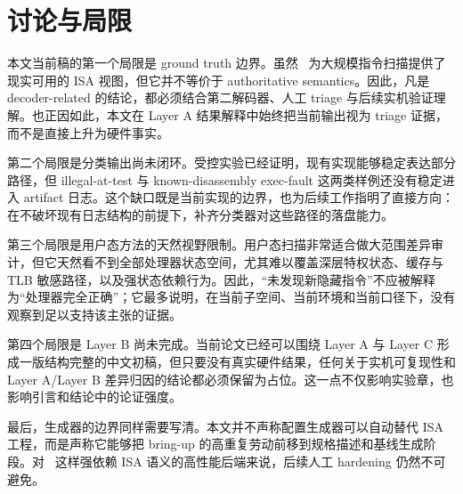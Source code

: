 \chapter{讨论与局限}

本文当前稿的第一个局限是 ground truth 边界。虽然 \capstone\ 为大规模指令扫描提供了现实可用的 ISA 视图，但它并不等价于 authoritative semantics。因此，凡是 decoder-related 的结论，都必须结合第二解码器、人工 triage 与后续实机验证理解。也正因如此，本文在 Layer A 结果解释中始终把当前输出视为 triage 证据，而不是直接上升为硬件事实。

第二个局限是分类输出尚未闭环。受控实验已经证明，现有实现能够稳定表达部分路径，但 illegal-at-test 与 known-disassembly exec-fault 这两类样例还没有稳定进入 artifact 日志。这个缺口既是当前实现的边界，也为后续工作指明了直接方向：在不破坏现有日志结构的前提下，补齐分类器对这些路径的落盘能力。

第三个局限是用户态方法的天然视野限制。用户态扫描非常适合做大范围差异审计，但它天然看不到全部处理器状态空间，尤其难以覆盖深层特权状态、缓存与 TLB 敏感路径，以及强状态依赖行为。因此，“未发现新隐藏指令”不应被解释为“处理器完全正确”；它最多说明，在当前子空间、当前环境和当前口径下，没有观察到足以支持该主张的证据。

第四个局限是 Layer B 尚未完成。当前论文已经可以围绕 Layer A 与 Layer C 形成一版结构完整的中文初稿，但只要没有真实硬件结果，任何关于实机可复现性和 Layer A/Layer B 差异归因的结论都必须保留为占位。这一点不仅影响实验章，也影响引言和结论中的论证强度。

最后，生成器的边界同样需要写清。本文并不声称配置生成器可以自动替代 ISA 工程，而是声称它能够把 bring-up 的高重复劳动前移到规格描述和基线生成阶段。对 \memcage\ 这样强依赖 ISA 语义的高性能后端来说，后续人工 hardening 仍然不可避免。
